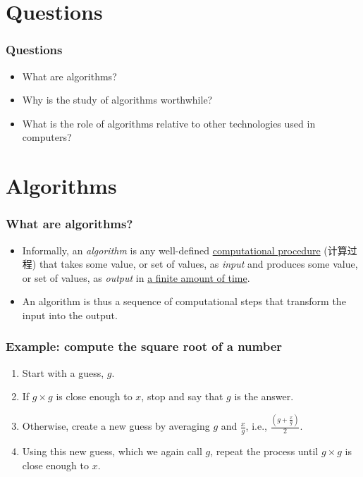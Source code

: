 \section{Questions}

\begin{frame}
    \frametitle{Questions}

    \begin{itemize}
        \item What are algorithms?
        \item Why is the study of algorithms worthwhile?
        \item What is the role of algorithms relative to other technologies used in computers?
    \end{itemize}

\end{frame}

\section{Algorithms}

\begin{frame}
    \frametitle{What are algorithms?}

    \begin{itemize}
        \item Informally, an \emph{algorithm} is any well-defined \underline{computational procedure} (计算过程) that takes some value, or set of values, as \emph{input} and produces some value, or set of values, as \emph{output} in \underline{a finite amount of time}.
        \item  An algorithm is thus a sequence of computational steps that transform the input into the output.
    \end{itemize}

\end{frame}

\begin{frame}
    \frametitle{Example: compute the square root of a number}

    \begin{enumerate}
        \item Start with a guess, $g$.
        \item If $g \times g$ is close enough to $x$, stop and say that $g$ is the answer.
        \item Otherwise, create a new guess by averaging $g$ and $\frac{x}{g}$, i.e., $\frac{(g + \frac{x}{g})}{2}$.
        \item Using this new guess, which we again call $g$, repeat the process until $g \times g$ is close enough to $x$.
    \end{enumerate}

\end{frame}


